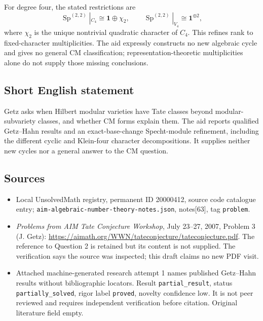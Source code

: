 \documentclass[11pt]{article}
\begin{document}
For degree four, the stated restrictions are
\[\operatorname{Sp}^{(2,2)}|_{C_4}\cong\mathbf1\oplus\chi_2,\qquad\operatorname{Sp}^{(2,2)}|_{V_4}\cong\mathbf1^{\oplus2},\]
where $\chi_2$ is the unique nontrivial quadratic character of $C_4$. This refines rank to fixed-character multiplicities. The aid expressly constructs no new algebraic cycle and gives no general CM classification; representation-theoretic multiplicities alone do not supply those missing conclusions.
\subsection{Short English statement}
Getz asks when Hilbert modular varieties have Tate classes beyond modular-subvariety classes, and whether CM forms explain them. The aid reports qualified Getz--Hahn results and an exact-base-change Specht-module refinement, including the different cyclic and Klein-four character decompositions. It supplies neither new cycles nor a general answer to the CM question.
\subsection{Sources}
\begin{itemize}
\item Local UnsolvedMath registry, permanent ID 20000412, source code catalogue entry; \texttt{aim-algebraic-number-theory-notes.json}, notes[63], tag \texttt{problem}.
\item \emph{Problems from AIM Tate Conjecture Workshop}, July 23--27, 2007, Problem 3 (J. Getz): \url{https://aimath.org/WWN/tateconjecture/tateconjecture.pdf}. The reference to Question 2 is retained but its content is not supplied. The verification says the source was inspected; this draft claims no new PDF visit.
\item Attached machine-generated research attempt 1 names published Getz--Hahn results without bibliographic locators. Result \texttt{partial\_result}, status \texttt{partially\_solved}, rigor label \texttt{proved}, novelty confidence low. It is not peer reviewed and requires independent verification before citation. Original literature field empty.
\end{itemize}
\end{document}
